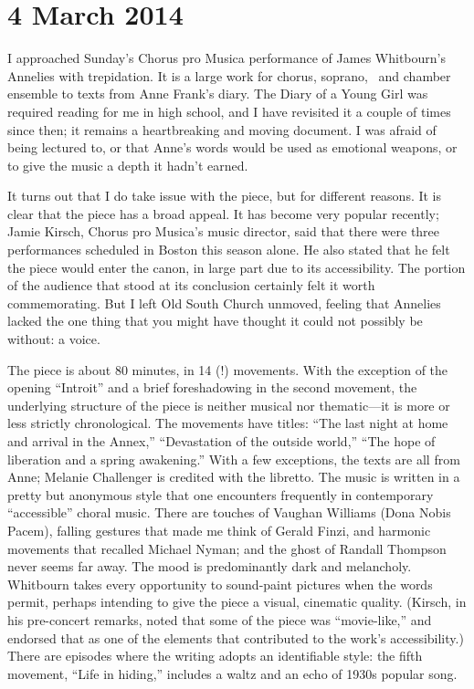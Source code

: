 \chapter{4 March 2014}

I approached Sunday’s Chorus pro Musica performance of James Whitbourn’s Annelies with trepidation. It is a large work for chorus, soprano,  and chamber ensemble to texts from Anne Frank’s diary. The Diary of a Young Girl was required reading for me in high school, and I have revisited it a couple of times since then; it remains a heartbreaking and moving document. I was afraid of being lectured to, or that Anne’s words would be used as emotional weapons, or to give the music a depth it hadn’t earned.

It turns out that I do take issue with the piece, but for different reasons. It is clear that the piece has a broad appeal. It has become very popular recently; Jamie Kirsch, Chorus pro Musica’s music director, said that there were three performances scheduled in Boston this season alone. He also stated that he felt the piece would enter the canon, in large part due to its accessibility. The portion of the audience that stood at its conclusion certainly felt it worth commemorating. But I left Old South Church unmoved, feeling that Annelies lacked the one thing that you might have thought it could not possibly be without: a voice.

The piece is about 80 minutes, in 14 (!) movements. With the exception of the opening “Introit” and a brief foreshadowing in the second movement, the underlying structure of the piece is neither musical nor thematic—it is more or less strictly chronological. The movements have titles: “The last night at home and arrival in the Annex,” “Devastation of the outside world,” “The hope of liberation and a spring awakening.” With a few exceptions, the texts are all from Anne; Melanie Challenger is credited with the libretto. The music is written in a pretty but anonymous style that one encounters frequently in contemporary “accessible” choral music. There are touches of Vaughan Williams (Dona Nobis Pacem), falling gestures that made me think of Gerald Finzi, and harmonic movements that recalled Michael Nyman; and the ghost of Randall Thompson never seems far away. The mood is predominantly dark and melancholy. Whitbourn takes every opportunity to sound-paint pictures when the words permit, perhaps intending to give the piece a visual, cinematic quality. (Kirsch, in his pre-concert remarks, noted that some of the piece was “movie-like,” and endorsed that as one of the elements that contributed to the work’s accessibility.) There are episodes where the writing adopts an identifiable style: the fifth movement, “Life in hiding,” includes a waltz and an echo of 1930s popular song.

